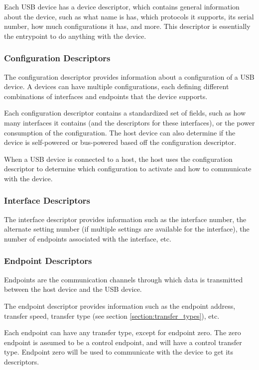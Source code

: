 Each USB device has a device descriptor, which contains general information about the device, such as what name is has, which protocols it supports, its serial number, how much configurations it has, and more. This descriptor is essentially the entrypoint to do anything with the device.

\subsubsection{Configuration Descriptors}

The configuration descriptor provides information about a configuration of a USB device. A devices can have multiple configurations, each defining different combinations of interfaces and endpoints that the device supports.

Each configuration descriptor contains a standardized set of fields, such as how many interfaces it contains (and the descriptors for these interfaces), or the power consumption of the configuration. The host device can also determine if the device is self-powered or bus-powered based off the configuration descriptor.

When a USB device is connected to a host, the host uses the configuration descriptor to determine which configuration to activate and how to communicate with the device.

\subsubsection{Interface Descriptors}

The interface descriptor provides information such as the interface number, the alternate setting number (if multiple settings are available for the interface), the number of endpoints associated with the interface, etc.

\subsubsection{Endpoint Descriptors}

Endpoints are the communication channels through which data is transmitted between the host device and the USB device.

The endpoint descriptor provides information such as the endpoint address, transfer speed, transfer type (see section \ref{section:transfer_types}), etc.

Each endpoint can have any transfer type, except for endpoint zero. The zero endpoint is assumed to be a control endpoint, and will have a control transfer type. Endpoint zero will be used to communicate with the device to get its descriptors.

